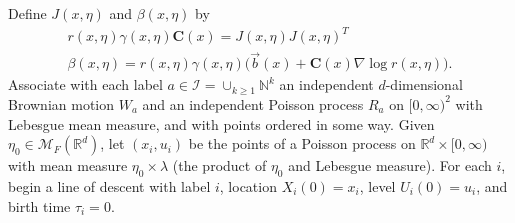 \documentclass[EJP]{ejpecp} %
\newcommand{\IR}{\mathbb R}
\newcommand{\IN}{\mathbb N}
\newcommand{\grad}{\nabla}
\newcommand{\meanq}{\vec b}    %
\newcommand{\covq}{\mathbf{C}}     %
\newcommand{\labelspace}{\mathcal{I}} %
\newcommand{\measures}{\mathcal{M}_F(\IR^d)} %
\begin{document}
\begin{proposition}
    \label{prop:limiting_construction}
Define $J(x,\eta)$ and $\beta(x,\eta)$ by
\begin{gather*}
    r(x,\eta)\gamma(x,\eta)\covq(x) = J(x,\eta) J(x,\eta)^T \\
    \beta(x, \eta) = r(x,\eta)\gamma(x,\eta)\big(\meanq(x) + \covq(x) \grad \log r(x, \eta)\big) .
\end{gather*}
Associate with each label $a \in \labelspace = \cup_{k\geq 1}\IN^k$
an independent $d$-dimensional Brownian motion $W_a$
and an independent Poisson process $R_a$ on $[0, \infty)^2$
with Lebesgue mean measure,
and with points ordered in some way.
Given $\eta_0 \in \measures$,
let $(x_i, u_i)$ be the points of a Poisson process
on $\IR^d \times [0, \infty)$ 
with mean measure $\eta_0\times \lambda$
(the product of $\eta_0$ and Lebesgue measure).
For each $i$, begin a line of descent
with label $i$, location $X_i(0) = x_i$, 
level $U_i(0) = u_i$, and birth time $\tau_i = 0$.


\end{proposition}
\end{document}
